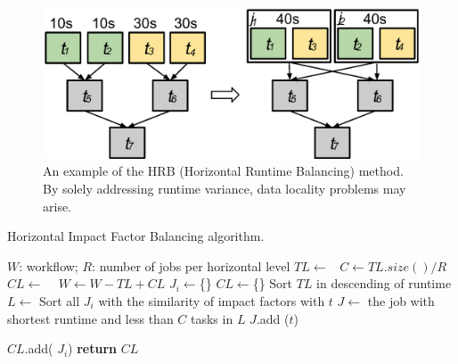 \documentclass[final,5p,times,twocolumn]{elsarticle}
\begin{document}
\begin{figure}[htb]
	\centering
	\includegraphics[width=0.85\linewidth]{figure8.eps}
	\caption{An example of the HRB (Horizontal Runtime Balancing) method. By solely addressing runtime variance, data locality problems may arise.}
	\label{fig:imbalance_hrb}
\end{figure}

\begin{algorithm}[!htb]
	\footnotesize
	\caption{Horizontal Impact Factor Balancing algorithm.}
	\label{alg:imbalance_hifb}
	\begin{algorithmic}[1]
		\Require $W$: workflow; $R$: number of jobs per horizontal level
				\State $TL\gets $\  
				\State $C \gets TL.size() / R$ 
				\State $CL\gets$  \  
				\State $W \gets W - TL + CL$   
			\EndFor
		\EndProcedure
			\State $J_i\gets$\{\}
			\EndFor
			\State $CL\gets$\{\}
			\State Sort $TL$ in descending of runtime
				\State $L\gets$ Sort all $J_i$ with the similarity of impact factors with $t$
				\State $J\gets$ the job with shortest runtime and less than $C$ tasks in $L$
				\State $J$.add ($t$) 
				
			\EndFor
			\State  $CL$.add( $J_i$)
			\EndFor
			\State \textbf{return} $CL$
		\EndProcedure
	\end{algorithmic}
\end{algorithm}
\end{document}
